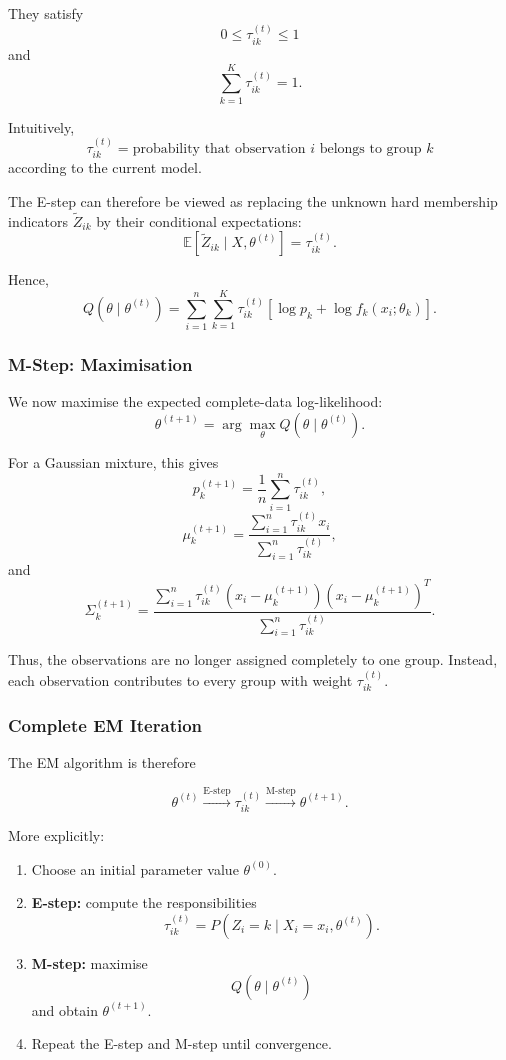 They satisfy
\[
0\leq\tau_{ik}^{(t)}\leq1
\]
and
\[
\sum_{k=1}^K\tau_{ik}^{(t)}=1.
\]

Intuitively,
\[
\boxed{
\tau_{ik}^{(t)}
=
\text{probability that observation $i$ belongs to group $k$}
}
\]
according to the current model.

The E-step can therefore be viewed as replacing the unknown hard
membership indicators $\tilde Z_{ik}$ by their conditional
expectations:
\[
\boxed{
\mathbb{E}[\tilde Z_{ik}\mid X,\theta^{(t)}]
=
\tau_{ik}^{(t)}
}.
\]

Hence,
\[
Q(\theta\mid\theta^{(t)})
=
\sum_{i=1}^n
\sum_{k=1}^K
\tau_{ik}^{(t)}
\left[
\log p_k+\log f_k(x_i;\theta_k)
\right].
\]

\subsubsection{M-Step: Maximisation}

We now maximise the expected complete-data log-likelihood:
\[
\theta^{(t+1)}
=
\arg\max_\theta
Q(\theta\mid\theta^{(t)}).
\]

For a Gaussian mixture, this gives
\[
p_k^{(t+1)}
=
\frac{1}{n}
\sum_{i=1}^n
\tau_{ik}^{(t)},
\]
\[
\mu_k^{(t+1)}
=
\frac{
\sum_{i=1}^n
\tau_{ik}^{(t)}x_i
}{
\sum_{i=1}^n
\tau_{ik}^{(t)}
},
\]
and
\[
\Sigma_k^{(t+1)}
=
\frac{
\sum_{i=1}^n
\tau_{ik}^{(t)}
(x_i-\mu_k^{(t+1)})
(x_i-\mu_k^{(t+1)})^T
}{
\sum_{i=1}^n
\tau_{ik}^{(t)}
}.
\]

Thus, the observations are no longer assigned completely to one
group. Instead, each observation contributes to every group with
weight $\tau_{ik}^{(t)}$.

\subsubsection{Complete EM Iteration}

The EM algorithm is therefore

\[
\boxed{
\theta^{(t)}
\overset{\text{E-step}}{\longrightarrow}
\tau_{ik}^{(t)}
\overset{\text{M-step}}{\longrightarrow}
\theta^{(t+1)}
}.
\]

More explicitly:

\begin{enumerate}
    \item Choose an initial parameter value $\theta^{(0)}$.
    
    \item \textbf{E-step:} compute the responsibilities
    \[
    \tau_{ik}^{(t)}
    =
    P(Z_i=k\mid X_i=x_i,\theta^{(t)}).
    \]
    
    \item \textbf{M-step:} maximise
    \[
    Q(\theta\mid\theta^{(t)})
    \]
    and obtain $\theta^{(t+1)}$.
    
    \item Repeat the E-step and M-step until convergence.
\end{enumerate}

